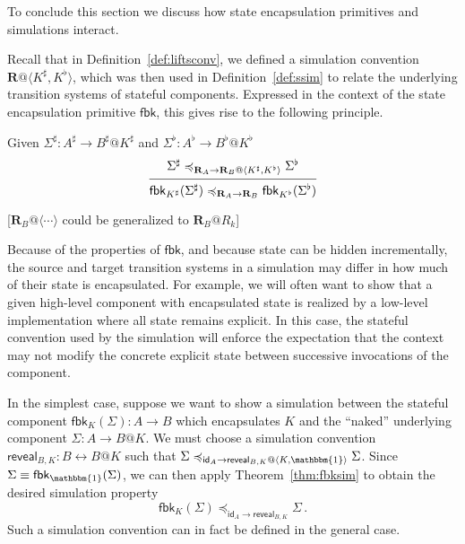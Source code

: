 \documentclass[acmsmall,screen,review,anonymous]{acmart}
\newcommand{\kw}[1]{\ensuremath{ \mathsf{#1} }}
\renewcommand{\preceq}{\preccurlyeq}
\begin{document}
To conclude this section we discuss how
state encapsulation primitives and simulations interact.

Recall that in Definition~\ref{def:liftsconv}, we defined a simulation convention
$\mathbf{R}@\langle K^\sharp, K^\flat \rangle$,
which was then used in Definition~\ref{def:ssim}
to relate the underlying transition systems
of stateful components.
Expressed in the context of the state encapsulation primitive $\kw{fbk}$,
this gives rise to the following principle.

\begin{lemma} \label{thm:fbksim}
Given $\Sigma^{\sharp} : A^{\sharp} \rightarrow B^{\sharp}@K^{\sharp}$
and $\Sigma^{\flat} : A^{\flat} \rightarrow B^{\flat}@K^{\flat}$
\[
  \begin{prooftree}
    \hypo{\Sigma^\sharp
      \preceq_{\mathbf{R}_A \rightarrow
	       \mathbf{R}_B@\langle K^\sharp,K^\flat \rangle}
      \Sigma^\flat}
    \infer1{\kw{fbk}_{K^\sharp}(\Sigma^\sharp)
      \preceq_{\mathbf{R}_A \rightarrow \mathbf{R}_B}
      \kw{fbk}_{K^\flat}(\Sigma^\flat)}
  \end{prooftree}
\]
\end{lemma}
[$\mathbf{R}_B@\langle \cdots \rangle$ could be generalized to
$\mathbf{R}_B@R_{k}$]

Because of the properties of $\kw{fbk}$,
and because state can be hidden incrementally,
the source and target transition systems in a simulation
may differ in how much of their state is encapsulated.
For example,
we will often want to show that
a given high-level component with encapsulated state
is realized by a low-level implementation
where all state remains explicit.
In this case,
the stateful convention used by the simulation
will enforce the expectation that
the context may not modify the concrete explicit state
between successive invocations of the component.

In the simplest case,
suppose we want to show a simulation between the stateful component
$\kw{fbk}_K(\Sigma) : A \rightarrow B$ which encapsulates $K$
and the ``naked'' underlying component $\Sigma : A \rightarrow B@K$.
We must choose a simulation convention
$\kw{reveal}_{B,K} : B \leftrightarrow B@K$ such that
$
  \Sigma
  \preceq_{\kw{id}_A \rightarrow \kw{reveal}_{B,K}@\langle K, \mathbbm{1} \rangle}
  \Sigma
$.
Since $\Sigma \equiv \kw{fbk}_\mathbbm{1}(\Sigma)$,
we can then apply Theorem~\ref{thm:fbksim} to obtain
the desired simulation property
\[
  \kw{fbk}_K(\Sigma)
  \preceq_{\kw{id}_A \rightarrow \kw{reveal}_{B,K}}
  \Sigma
  \,.
\]
Such a simulation convention can in fact be defined in the general case.
\end{document}
